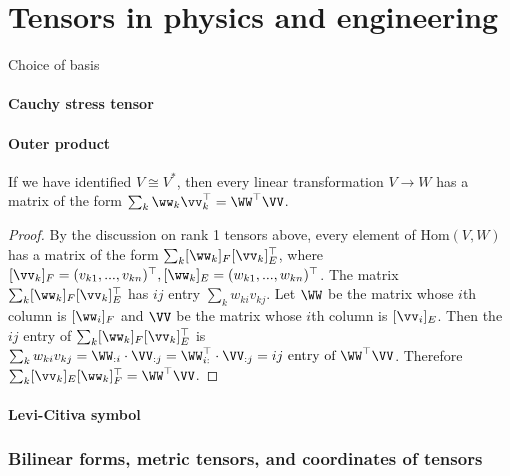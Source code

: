 \chapter{Tensors in physics and engineering}
\label{ch::tensors_engin}

Choice of basis

\subsubsection{Cauchy stress tensor}

\subsubsection{Outer product}


\begin{theorem}
    If we have identified $V \cong V^*$, then every linear transformation $V \rightarrow W$ has a matrix of the form $\sum_k \ww_k \vv_k^\top = \WW^\top \VV$.
\end{theorem}

\begin{proof}
    By the discussion on rank 1 tensors above, every element of $\text{Hom}(V, W)$ has a matrix of the form $\sum_k [\ww_k]_F [\vv_k]_E^\top$, where $[\vv_k]_F = (v_{k1}, ..., v_{kn})^\top, [\ww_k]_E = (w_{k1}, ..., w_{kn})^\top$. The matrix $\sum_k [\ww_k]_F [\vv_k]_E^\top$ has $ij$ entry $\sum_k w_{ki} v_{kj}$. Let $\WW$ be the matrix whose $i$th column is $[\ww_i]_F$ and $\VV$ be the matrix whose $i$th column is $[\vv_i]_E$. Then the $ij$ entry of $\sum_k [\ww_k]_F [\vv_k]_E^\top$ is $\sum_k w_{ki} v_{kj} = \WW_{:i} \cdot \VV_{:j} = \WW_{i:}^\top \cdot \VV_{:j} = ij \text{ entry of $\WW^\top \VV$}$. Therefore $\sum_k [\vv_k]_E [\ww_k]_F^\top = \WW^\top \VV$.
\end{proof}

\subsubsection{Levi-Citiva symbol}

\subsection*{Bilinear forms, metric tensors, and coordinates of tensors}

